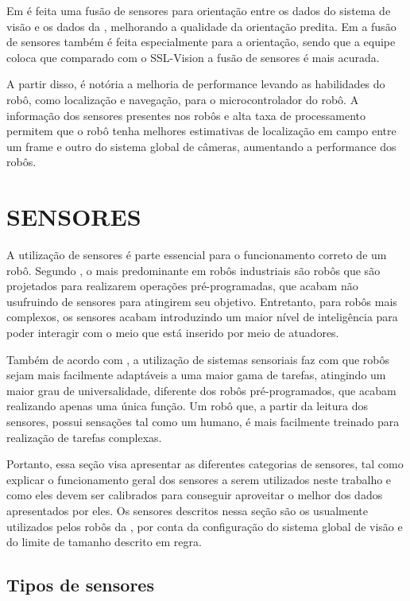 \documentclass[acronym, symbols, table]{fei}
\begin{document}
				Em \textcite{immortals_2023} é feita uma fusão de sensores para orientação entre os dados do sistema de visão e os dados da , melhorando a qualidade da orientação predita. Em \textcite{parsian_2019} a fusão de sensores também é feita especialmente para a orientação, sendo que a equipe coloca que comparado com o SSL-Vision a fusão de sensores é mais acurada.
				
				A partir disso, é notória a melhoria de performance levando as habilidades do robô, como localização e navegação, para o microcontrolador do robô. A informação dos sensores presentes nos robôs e alta taxa de processamento permitem que o robô tenha melhores estimativas de localização em campo entre um frame e outro do sistema global de câmeras, aumentando a performance dos robôs.
		
	\section{SENSORES} \label{sec:sensores}
	
		A utilização de sensores é parte essencial para o funcionamento correto de um robô. Segundo \textcite{de2017tipos}, o mais predominante em robôs industriais são robôs que são projetados para realizarem operações pré-programadas, que acabam não usufruindo de sensores para atingirem seu objetivo. Entretanto, para robôs mais complexos, os sensores acabam introduzindo um maior nível de inteligência para poder interagir com o meio que está inserido por meio de atuadores.
		
		Também de acordo com \textcite{de2017tipos}, a utilização de sistemas sensoriais faz com que robôs sejam mais facilmente adaptáveis a uma maior gama de tarefas, atingindo um maior grau de universalidade, diferente dos robôs pré-programados, que acabam realizando apenas uma única função. Um robô que, a partir da leitura dos sensores, possui sensações tal como um humano, é mais facilmente treinado para realização de tarefas complexas.
		
		Portanto, essa seção visa apresentar as diferentes categorias de sensores, tal como explicar o funcionamento geral dos sensores a serem utilizados neste trabalho e como eles devem ser calibrados para conseguir aproveitar o melhor dos dados apresentados por eles. Os sensores descritos nessa seção são os usualmente utilizados pelos robôs da , por conta da configuração do sistema global de visão e do limite de tamanho descrito em regra.
		
		\subsection{Tipos de sensores}		
		
\end{document}
